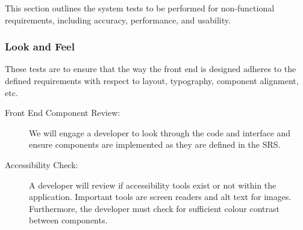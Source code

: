 \documentclass[12pt, titlepage]{article}
\begin{document}


This section outlines the system tests to be performed for non-functional requirements, including accuracy, performance, and usability.

\subsubsection{Look and Feel}
These tests are to ensure that the way the front end is designed adheres to the
defined requirements with respect to layout, typography, component alignment,
etc. 

\begin{description}
  \item[Front End Component Review:] We will engage a developer to look through
  the code and interface and ensure components are implemented as they are
  defined in the SRS.
  \item[Accessibility Check:] A developer will review if accessibility tools
  exist or not within the application. Important tools are screen readers and
  alt text for images. Furthermore, the developer must check for sufficient
  colour contrast between components.
\end{description}
\end{document}

